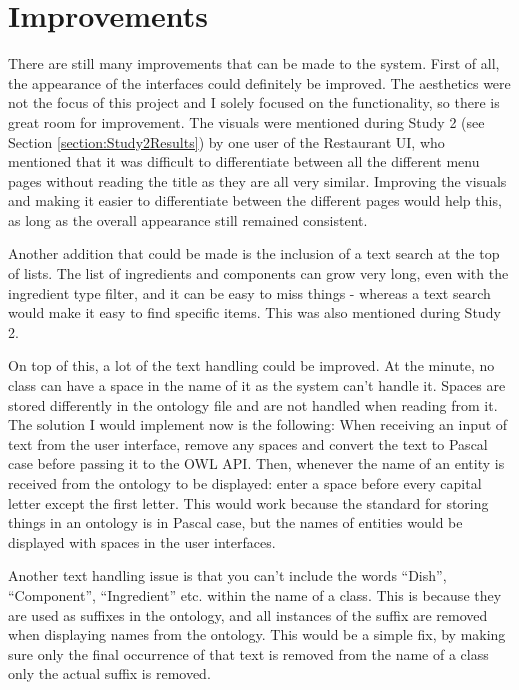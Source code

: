 \section{Improvements}

There are still many improvements that can be made to the system. First of all, the appearance of the interfaces could definitely be improved. The aesthetics were not the focus of this project and I solely focused on the functionality, so there is great room for improvement. The visuals were mentioned during Study 2 (see Section \ref{section:Study2Results}) by one user of the Restaurant UI, who mentioned that it was difficult to differentiate between all the different menu pages without reading the title as they are all very similar. Improving the visuals and making it easier to differentiate between the different pages would help this, as long as the overall appearance still remained consistent.

Another addition that could be made is the inclusion of a text search at the top of lists. The list of ingredients and components can grow very long, even with the ingredient type filter, and it can be easy to miss things - whereas a text search would make it easy to find specific items. This was also mentioned during Study 2.

On top of this, a lot of the text handling could be improved. At the minute, no class can have a space in the name of it as the system can't handle it. Spaces are stored differently in the ontology file and are not handled when reading from it. The solution I would implement now is the following: When receiving an input of text from the user interface, remove any spaces and convert the text to Pascal case before passing it to the OWL API. Then, whenever the name of an entity is received from the ontology to be displayed: enter a space before every capital letter except the first letter. This would work because the standard for storing things in an ontology is in Pascal case, but the names of entities would be displayed with spaces in the user interfaces.

Another text handling issue is that you can't include the words ``Dish'', ``Component'', ``Ingredient'' etc. within the name of a class. This is because they are used as suffixes in the ontology, and all instances of the suffix are removed when displaying names from the ontology. This would be a simple fix, by making sure only the final occurrence of that text is removed from the name of a class only the actual suffix is removed.

